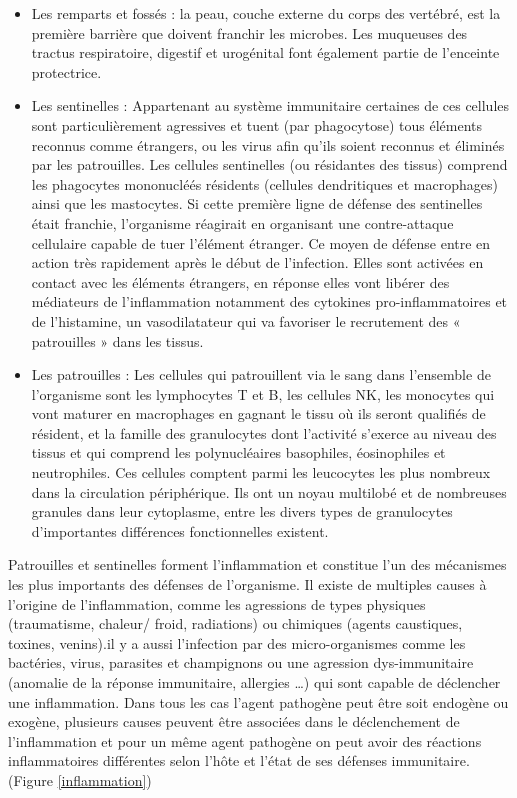\begin{itemize}
\item Les remparts et fossés : la peau, couche externe du corps des vertébré, est la première barrière que doivent franchir les microbes. Les muqueuses des tractus respiratoire, digestif et urogénital font également partie de l’enceinte protectrice.
\item Les sentinelles : Appartenant au système immunitaire certaines de ces cellules sont particulièrement agressives et tuent (par phagocytose) tous éléments reconnus comme étrangers, ou les virus afin qu’ils soient reconnus et éliminés par les patrouilles. Les cellules sentinelles (ou résidantes des tissus) comprend les phagocytes mononucléés résidents (cellules dendritiques et macrophages) ainsi que les mastocytes. Si cette première ligne de défense des sentinelles était franchie, l’organisme réagirait en organisant une contre-attaque cellulaire capable de tuer l’élément étranger. Ce moyen de défense entre en action très rapidement après le début de l’infection. Elles sont activées en contact avec les éléments étrangers, en réponse elles vont libérer des médiateurs de l’inflammation notamment des cytokines pro-inflammatoires et de l’histamine, un vasodilatateur qui va favoriser le recrutement des « patrouilles » dans les tissus.
\item Les patrouilles : Les cellules qui patrouillent via le sang dans l’ensemble de l’organisme sont les lymphocytes T et B, les cellules NK, les monocytes qui vont maturer en macrophages en gagnant le tissu où ils seront qualifiés de résident, et la famille des granulocytes dont l’activité s’exerce au niveau des tissus et qui comprend les polynucléaires basophiles, éosinophiles et neutrophiles. Ces cellules comptent parmi les leucocytes les plus nombreux dans la circulation périphérique. Ils ont un noyau multilobé et de nombreuses granules dans leur cytoplasme, entre les divers types de granulocytes d’importantes différences fonctionnelles existent. 
\end{itemize}
Patrouilles et sentinelles forment l’inflammation et constitue l’un des mécanismes les plus importants des défenses de l’organisme. Il existe de multiples causes à l’origine de l'inflammation, comme les agressions de types physiques (traumatisme, chaleur/ froid, radiations) ou chimiques (agents caustiques, toxines, venins).il y a aussi l’infection par des micro-organismes comme les bactéries, virus, parasites et champignons ou une agression dys-immunitaire (anomalie de la réponse immunitaire, allergies …) qui sont capable de déclencher une inflammation. Dans tous les cas l’agent pathogène peut être soit endogène ou exogène, plusieurs causes peuvent être associées dans le déclenchement de l’inflammation et pour un même agent pathogène on peut avoir des réactions inflammatoires différentes selon l’hôte et l’état de ses défenses immunitaire. (Figure \ref{inflammation})
